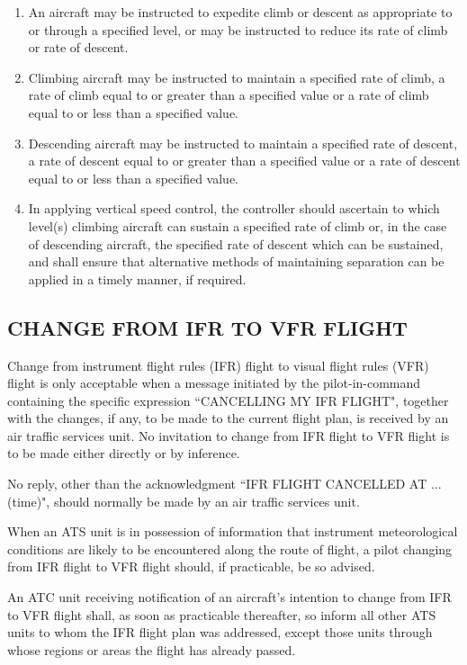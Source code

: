 \begin{enumerate}
    \item An aircraft may be instructed to expedite climb or descent as appropriate to or through a specified level, or may be instructed to reduce its rate of climb or rate of descent.
    \item Climbing aircraft may be instructed to maintain a specified rate of climb, a rate of climb equal to or greater than a specified value or a rate of climb equal to or less than a specified value.
    \item Descending aircraft may be instructed to maintain a specified rate of descent, a rate of descent equal to or greater than a specified value or a rate of descent equal to or less than a specified value.
    \item In applying vertical speed control, the controller should ascertain to which level(s) climbing aircraft can sustain a specified rate of climb or, in the case of descending aircraft, the specified rate of descent which can be sustained, and shall ensure that alternative methods of maintaining separation can be applied in a timely manner, if required.
\end{enumerate}

\subsection[Change from IFR to VFR flight]{CHANGE FROM IFR TO VFR FLIGHT}

\begin{enumnoss}
    \item Change from instrument flight rules (IFR) flight to visual flight rules (VFR) flight is only acceptable when a message initiated by the pilot-in-command containing the specific expression ``CANCELLING MY IFR FLIGHT", together with the changes, if any, to be made to the current flight plan, is received by an air traffic services unit. No invitation to change from IFR flight to VFR flight is to be made either directly or by inference.
    \item No reply, other than the acknowledgment ``IFR FLIGHT CANCELLED AT ... (time)", should normally be made by an air traffic services unit.
    \item When an ATS unit is in possession of information that instrument meteorological conditions are likely to be encountered along the route of flight, a pilot changing from IFR flight to VFR flight should, if practicable, be so advised.
    \item An ATC unit receiving notification of an aircraft's intention to change from IFR to VFR flight shall, as soon as practicable thereafter, so inform all other ATS units to whom the IFR flight plan was addressed, except those units through whose regions or areas the flight has already passed.
\end{enumnoss}

